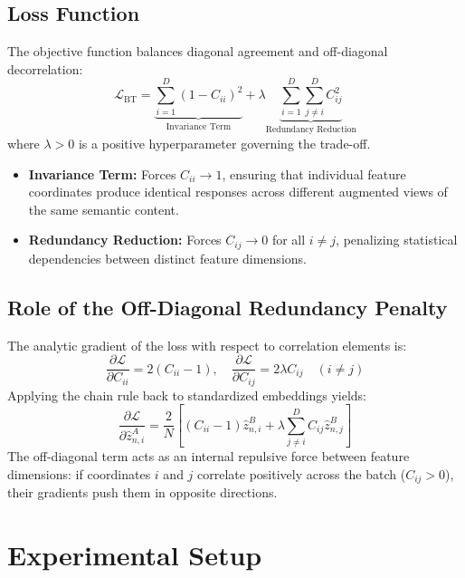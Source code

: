\documentclass[conference]{IEEEtran}
\begin{document}
\subsection{Loss Function}
The objective function balances diagonal agreement and off-diagonal decorrelation:
\begin{equation}
    \mathcal{L}_{\text{BT}} = \underbrace{\sum_{i=1}^D (1 - C_{ii})^2}_{\text{Invariance Term}} + \lambda \underbrace{\sum_{i=1}^D \sum_{j \ne i}^D C_{ij}^2}_{\text{Redundancy Reduction}}
\end{equation}
where $\lambda > 0$ is a positive hyperparameter governing the trade-off.
\begin{itemize}
    \item \textbf{Invariance Term:} Forces $C_{ii} \to 1$, ensuring that individual feature coordinates produce identical responses across different augmented views of the same semantic content.
    \item \textbf{Redundancy Reduction:} Forces $C_{ij} \to 0$ for all $i \ne j$, penalizing statistical dependencies between distinct feature dimensions.
\end{itemize}

\subsection{Role of the Off-Diagonal Redundancy Penalty}
The analytic gradient of the loss with respect to correlation elements is:
\begin{equation}
    \frac{\partial \mathcal{L}}{\partial C_{ii}} = 2(C_{ii} - 1), \quad \frac{\partial \mathcal{L}}{\partial C_{ij}} = 2\lambda C_{ij} \quad (i \ne j)
\end{equation}
Applying the chain rule back to standardized embeddings yields:
\begin{equation}
    \frac{\partial \mathcal{L}}{\partial \hat{z}_{n, i}^A} = \frac{2}{N} \left[ (C_{ii} - 1) \hat{z}_{n, i}^B + \lambda \sum_{j \ne i}^D C_{ij} \hat{z}_{n, j}^B \right]
\end{equation}
The off-diagonal term acts as an internal repulsive force between feature dimensions: if coordinates $i$ and $j$ correlate positively across the batch ($C_{ij} > 0$), their gradients push them in opposite directions.

\section{Experimental Setup}
\end{document}
